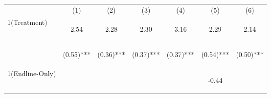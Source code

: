 \begin{center}
\begin{tabular}{lcccccc}
\hline \noalign{\smallskip} & (1) & (2) & (3) & (4) & (5) & (6)\\
\noalign{\smallskip}\hline \noalign{\smallskip}1(Treatment) & \begin{footnotesize}2.54\end{footnotesize} & \begin{footnotesize}2.28\end{footnotesize} & \begin{footnotesize}2.30\end{footnotesize} & \begin{footnotesize}3.16\end{footnotesize} & \begin{footnotesize}2.29\end{footnotesize} & \begin{footnotesize}2.14\end{footnotesize}\\
 & \begin{footnotesize}(0.55)***\end{footnotesize} & \begin{footnotesize}(0.36)***\end{footnotesize} & \begin{footnotesize}(0.37)***\end{footnotesize} & \begin{footnotesize}(0.37)***\end{footnotesize} & \begin{footnotesize}(0.54)***\end{footnotesize} & \begin{footnotesize}(0.50)***\end{footnotesize}\\
\noalign{\smallskip}1(Endline-Only) & \begin{footnotesize}\end{footnotesize} & \begin{footnotesize}\end{footnotesize} & \begin{footnotesize}\end{footnotesize} & \begin{footnotesize}\end{footnotesize} & \begin{footnotesize}-0.44\end{footnotesize} & \begin{footnotesize}\end{footnotesize}\\

\end{tabular}
\end{center}
